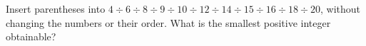 Insert parentheses into $4\div6\div8\div9\div10\div12\div14\div15\div16\div18\div20$, without changing the numbers or their order. What is the smallest positive integer obtainable?
